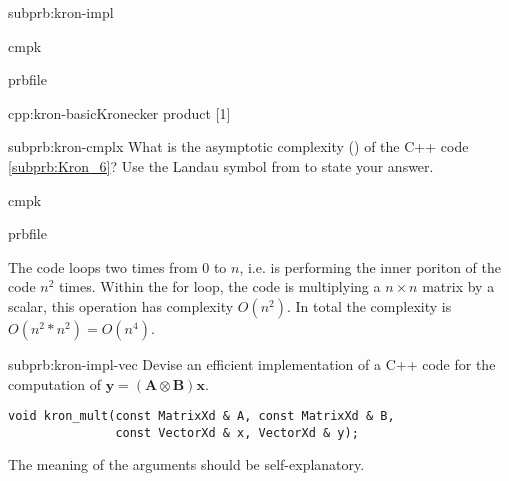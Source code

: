 \begin{samproblem}
\begin{subproblem}{subprb:kron-impl}
\begin{samwriteprbpart}{cmpk}
  \begin{writeverbatim}{prbfile}
    \begin{samsolution}
      \begin{samcode}[C++11-code]{cpp:kron-basic}{Kronecker product}
        [1]
      \end{samcode}
    \end{samsolution}
  \end{writeverbatim}
\end{samwriteprbpart}
\end{subproblem}

\begin{subproblem}{subprb:kron-cmplx}
What is the asymptotic complexity ()
of the C++ code \ref{subprb:Kron_6}? Use the Landau symbol
from  to state your answer.

\begin{samwriteprbpart}{cmpk}
  \begin{writeverbatim}{prbfile}
    \begin{samsolution}
      The code loops two times from $0$ to $n$, i.e. is performing the inner
      poriton of the code $n^2$ times.
      Within the for loop, the
      code is multiplying a $n \times n$ matrix by a scalar, this operation
      has complexity $O(n^2)$.
      In total the complexity is $O(n^2*n^2)=O(n^4)$.
      \end{samsolution}
    \end{writeverbatim}
  \end{samwriteprbpart}
\end{subproblem}

\begin{subproblem}{subprb:kron-impl-vec}
  Devise an efficient implementation of a C++ code for the computation of
  $\mathbf{y} = (\mathbf{A} \otimes \mathbf{B}) \mathbf{x}$.
  \begin{lstlisting}[style=cppsimple]
void kron_mult(const MatrixXd & A, const MatrixXd & B,
               const VectorXd & x, VectorXd & y);
  \end{lstlisting}
  The meaning of the arguments should be self-explanatory.


\end{subproblem}
\end{samproblem}
